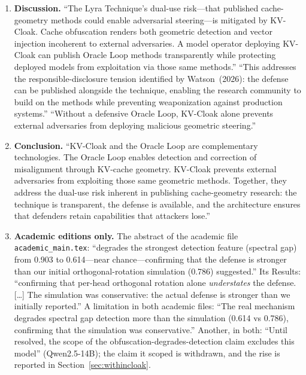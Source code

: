 \documentclass[11pt,a4paper]{article}
\begin{document}
\begin{enumerate}
\item \textbf{Discussion.} ``The Lyra Technique's dual-use risk---that
published cache-geometry methods could enable adversarial steering---is
mitigated by KV-Cloak. Cache obfuscation renders both geometric detection
and vector injection incoherent to external adversaries. A model operator
deploying KV-Cloak can publish Oracle Loop methods transparently while
protecting deployed models from exploitation via those same methods.''
``This addresses the responsible-disclosure tension identified by
Watson~(2026): the defense can be published alongside the technique,
enabling the research community to build on the methods while preventing
weaponization against production systems.'' ``Without a defensive Oracle
Loop, KV-Cloak alone prevents external adversaries from deploying
malicious geometric steering.''

\item \textbf{Conclusion.} ``KV-Cloak and the Oracle Loop are
complementary technologies. The Oracle Loop enables detection and
correction of misalignment through KV-cache geometry. KV-Cloak prevents
external adversaries from exploiting those same geometric methods.
Together, they address the dual-use risk inherent in publishing
cache-geometry research: the technique is transparent, the defense is
available, and the architecture ensures that defenders retain
capabilities that attackers lose.''

\item \textbf{Academic editions only.} The abstract of the academic file
\nolinkurl{academic_main.tex}: ``degrades the strongest detection feature
(spectral gap) from 0.903 to 0.614---near chance---confirming that the
defense is stronger than our initial orthogonal-rotation simulation
(0.786) suggested.'' Its Results: ``confirming that per-head orthogonal
rotation alone \emph{understates} the defense. [\ldots] The simulation was
conservative: the actual defense is stronger than we initially
reported.'' A limitation in both academic files: ``The real mechanism
degrades spectral gap detection more than the simulation (0.614 vs
0.786), confirming that the simulation was conservative.'' Another, in
both: ``Until resolved, the scope of the obfuscation-degrades-detection
claim excludes this model'' (Qwen2.5-14B); the claim it scoped is
withdrawn, and the rise is reported in Section~\ref{sec:withincloak}.


\end{enumerate}
\end{document}
